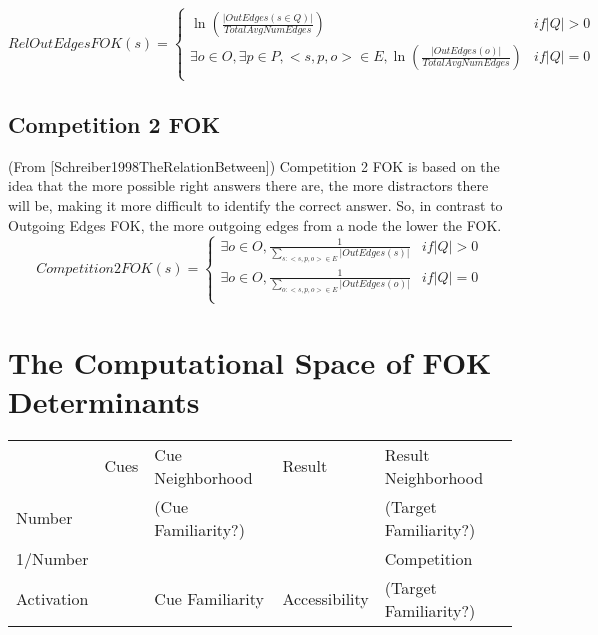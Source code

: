 \documentclass[10pt,letterpaper]{article}
\begin{document}
$$RelOutEdgesFOK(s) =
\begin{cases}
    \ln (\frac{|OutEdges(s \in Q)|}{TotalAvgNumEdges}) & {if |Q| > 0} \\
    \exists o{\in}O, \exists p{\in}P, <s, p, o>{\in}E, \ln(\frac{|OutEdges(o)|}{TotalAvgNumEdges}) & {if |Q| = 0} \\
\end{cases}
$$

\subsection{Competition 2 FOK}

(From [Schreiber1998TheRelationBetween])
Competition 2 FOK is based on the idea that the more possible right answers there are, the more distractors there will be, making it more difficult to identify the correct answer. So, in contrast to Outgoing Edges FOK, the more outgoing edges from a node the lower the FOK.
\noindent$$Competition2FOK(s) =
\begin{cases}
    \exists o{\in}O, \frac{1}{\sum\limits_{s: <s, p, o> \in E} {|OutEdges(s)|}} & {if |Q| > 0} \\
    \exists o{\in}O, \frac{1}{\sum\limits_{o: <s, p, o> \in E} {|OutEdges(o)|}} & {if |Q| = 0} \\
\end{cases}
$$

\section{The Computational Space of FOK Determinants}

\begin{table*}[ht]
\begin{tabular}{lllll}
                                & Cues                                  & Cue Neighborhood                          & Result                              & Result Neighborhood                     \\ \cline{2-5} 
\multicolumn{1}{l|}{Number}     & \multicolumn{1}{l|}{\cellcolor{gray!70}}    & \multicolumn{1}{l|}{(Cue Familiarity?)}              & \multicolumn{1}{l|}{\cellcolor{gray!70}}  & \multicolumn{1}{l|}{(Target Familiarity?)}            \\ \cline{2-5} 
\multicolumn{1}{l|}{1/Number}   & \multicolumn{1}{l|}{\cellcolor{gray!70}}    & \multicolumn{1}{l|}{}              & \multicolumn{1}{l|}{\cellcolor{gray!70}}  & \multicolumn{1}{l|}{Competition}            \\ \cline{2-5} 
\multicolumn{1}{l|}{Activation} & \multicolumn{1}{l|}{\cellcolor{black}} & \multicolumn{1}{l|}{Cue Familiarity} & \multicolumn{1}{l|}{Accessibility} & \multicolumn{1}{l|}{(Target Familiarity?)} \\ \cline{2-5} 
\end{tabular}
\end{table*}
\end{document}
